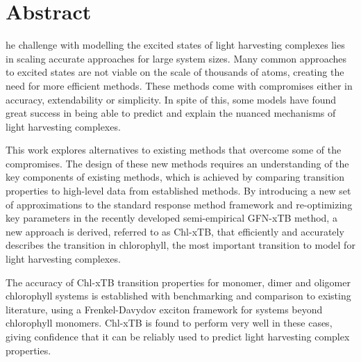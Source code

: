 %
%
%

\chapter*{Abstract}
\begin{SingleSpace}
he challenge with modelling the excited states of light harvesting complexes
lies in scaling accurate approaches for large system sizes. Many common approaches 
to excited states are not viable on the scale of thousands of atoms, creating the 
need for more efficient methods. These methods come with compromises either in accuracy,
extendability or simplicity. In spite of this, some models have found great success 
in being able to predict and explain the nuanced mechanisms of light harvesting
complexes. 

This work explores alternatives to existing methods that overcome some of the compromises.
The design of these new methods requires an understanding of the key components of 
existing methods, which is achieved by comparing transition properties to high-level 
data from established methods. By introducing a new set of approximations to the
standard response method framework and re-optimizing key parameters in the recently
developed semi-empirical GFN-xTB method, a new approach is derived, referred to 
as Chl-xTB, that efficiently and accurately describes the \Qy transition in chlorophyll,
the most important transition to model for light harvesting complexes.

The accuracy of Chl-xTB transition properties for monomer, dimer and oligomer chlorophyll
systems is established with benchmarking and comparison to existing literature,
using a Frenkel-Davydov exciton framework for systems beyond chlorophyll monomers.
Chl-xTB is found to perform very well in these cases, giving confidence that it 
can be reliably used to predict light harvesting complex properties.


\end{SingleSpace}
